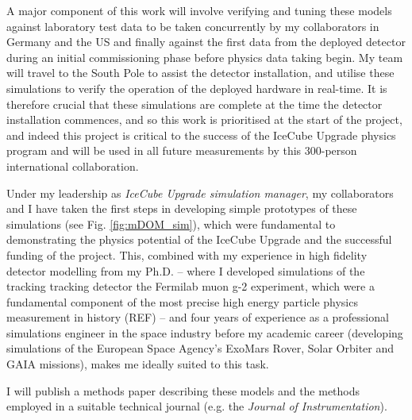 \documentclass[a4paper,11pt]{article}
\begin{document}
A major component of this work will involve verifying and tuning these models against laboratory test data to be taken concurrently by my collaborators in Germany and the US and finally against the first data from the deployed detector during an initial commissioning phase before physics data taking begin. My team will travel to the South Pole to assist the detector installation, and utilise these simulations to verify the operation of the deployed hardware in real-time. It is therefore crucial that these simulations are complete at the time the detector installation commences, and so this work is prioritised at the start of the project, and indeed this project is critical to the success of the IceCube Upgrade physics program and will be used in all future measurements by this 300-person international collaboration.  

Under my leadership as \textit{IceCube Upgrade simulation manager}, my collaborators and I have taken the first steps in developing simple prototypes of these simulations (see Fig. \ref{fig:mDOM_sim}), which were fundamental to demonstrating the physics potential of the IceCube Upgrade and the successful funding of the project. This, combined with my experience in high fidelity detector modelling from my Ph.D. -- where I developed simulations of the tracking tracking detector the Fermilab muon g-2 experiment, which were a fundamental component of the most precise high energy particle physics measurement in history (REF) -- and four years of experience as a professional simulations engineer in the space industry before my academic career (developing simulations of the European Space Agency's ExoMars Rover, Solar Orbiter and GAIA missions), makes me ideally suited to this task. 

I will publish a methods paper describing these models and the methods employed in a suitable technical journal (e.g. the \textit{Journal of Instrumentation}). \\

\end{document}

